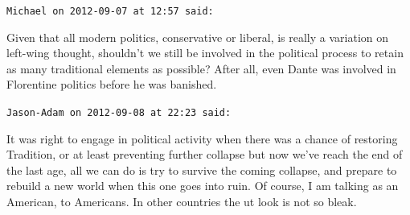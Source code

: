 \begin{footnotesize}
\begin{sffamily}
\hfill

\texttt{Michael on 2012-09-07 at 12:57 said: }

Given that all modern politics, conservative or liberal, is really a variation on left-wing thought, shouldn't we still be involved in the political process to retain as many traditional elements as possible? After all, even Dante was involved in Florentine politics before he was banished.


\hfill

\texttt{Jason-Adam on 2012-09-08 at 22:23 said: }

It was right to engage in political activity when there was a chance of restoring Tradition, or at least preventing further collapse but now we've reach the end of the last age, all we can do is try to survive the coming collapse, and prepare to rebuild a new world when this one goes into ruin. Of course, I am talking as an American, to Americans. In other countries the ut look is not so bleak.


\end{sffamily}\end{footnotesize}
